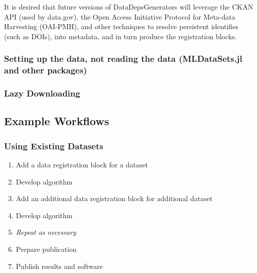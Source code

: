 \documentclass{jors}
\begin{document}
It is desired that future versions of DataDepsGenerators will leverage the CKAN API (used by data.gov), the Open Access Initiative Protocol for Meta-data Harvesting (OAI-PMH), and other techniques to resolve persistent identifies (such as DOIs), into metadata, and in turn produce the registration blocks.


\subsubsection{Setting up the data, not reading the data (MLDataSets.jl and other packages)}

\subsubsection{Lazy Downloading}


\subsection{Example Workflows}

\subsubsection{Using Existing Datasets}
\begin{enumerate}
	\item Add a data registration block for a dataset
	\item Develop algorithm
	\item Add an additional data registration block for additional dataset 
	\item Develop algorithm
	\item \emph{Repeat as necessary}
	\item Prepare publication
	\item Publish results and software
\end{enumerate}
\end{document}

